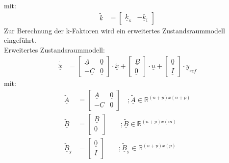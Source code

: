 mit:
\begin{align}
    \underline{\tilde{k}} &= 
    \begin{bmatrix}
    \underline{k}_{\mathrm{x}} & -\underline{k}_{\mathrm{I}}
    \end{bmatrix}
    \label{eq:Gleichung27}
\end{align}
Zur Berechnung der k-Faktoren wird ein erweitertes Zustandsraummodell eingeführt.\\
\newline
Erweitertes Zustandsraummodell:
\begin{align}
    \underline{\dot{\tilde{x}}} &= 
    \begin{bmatrix}
        \underline{A} & \underline{0} \\
        -\underline{C} & \underline{0}
    \end{bmatrix} \cdot \underline{\tilde{x}} +
    \begin{bmatrix}
        \underline{B} \\
        \underline{0}
    \end{bmatrix} \cdot\underline{u} +
    \begin{bmatrix}
        \underline{0} \\
        \underline{I}
    \end{bmatrix} \cdot\underline{y}_{ref}
    \label{eq:Gleichung28}
\end{align}
\newline
mit:
\begin{align*}
    \underline{\tilde{A}} &= 
    \begin{bmatrix}
        \underline{A} & \underline{0} \\
        -\underline{C} & \underline{0}
    \end{bmatrix} \quad ; \underline{\tilde{A}}\in\mathbb{R}^{(n+p)x(n+p)}\\
    \underline{\tilde{B}} &= 
    \begin{bmatrix}
        \underline{B} \\
        \underline{0}
    \end{bmatrix}\qquad ; \underline{\tilde{B}}\in\mathbb{R}^{(n+p)x(m)}\\
    \underline{\tilde{B}}_{\mathrm{y}} &= 
    \begin{bmatrix}
        \underline{0} \\
        \underline{I}
    \end{bmatrix}\qquad  ;\underline{\tilde{B}}_{\mathrm{y}}\in\mathbb{R}^{(n+p)x(p)}
\end{align*}
